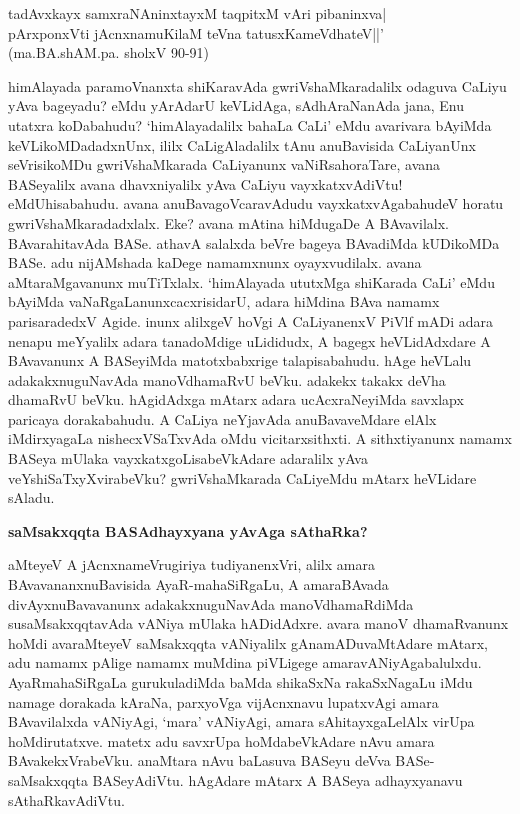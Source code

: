 \begin{shloka}
tadAvxkayx samxraNAninxtayxM taqpitxM vAri pibaninxva|\\
pArxponxVti jAcnxnamuKilaM teVna tatusxKameVdhateV||'\\
\hfill(ma.BA.shAM.pa. sholxV 90-91)
\end{shloka}

himAlayada paramoVnanxta shiKaravAda gwriVshaMkaradalilx odaguva CaLiyu yAva bageyadu? eMdu yArAdarU keVLidAga, sAdhAraNanAda jana, Enu utatxra koDabahudu?  `himAlayadalilx bahaLa CaLi' eMdu avarivara bAyiMda keVLikoMDadadxnUnx, ililx CaLigAladalilx tAnu anuBavisida CaLiyanUnx seVrisikoMDu gwriVshaMkarada CaLiyanunx vaNiRsahoraTare, avana BASeyalilx avana dhavxniyalilx yAva CaLiyu vayxkatxvAdiVtu! eMdUhisabahudu. avana anuBavagoVcaravAdudu vayxkatxvAgabahudeV horatu gwriVshaMkaradadxlalx. Eke? avana mAtina hiMdugaDe A BAvavilalx. BAvarahitavAda BASe. athavA salalxda beVre bageya BAvadiMda kUDikoMDa BASe. adu nijAMshada kaDege namamxnunx oyayxvudilalx. avana aMtaraMgavanunx muTiTxlalx. `himAlayada ututxMga shiKarada CaLi' eMdu bAyiMda vaNaRgaLanunxcacxrisidarU, adara hiMdina BAva namamx parisaradedxV Agide. inunx alilxgeV hoVgi A CaLiyanenxV PiVlf mADi adara nenapu meYyalilx adara tanadoMdige uLididudx, A bagegx heVLidAdxdare A BAvavanunx A BASeyiMda matotxbabxrige talapisabahudu. hAge heVLalu adakakxnuguNavAda manoVdhamaRvU beVku. adakekx takakx deVha dhamaRvU beVku. hAgidAdxga mAtarx adara ucAcxraNeyiMda savxlapx paricaya dorakabahudu. A CaLiya neYjavAda anuBavaveMdare elAlx iMdirxyagaLa nishecxVSaTxvAda oMdu vicitarxsithxti. A sithxtiyanunx namamx BASeya mUlaka vayxkatxgoLisabeVkAdare adaralilx yAva veYshiSaTxyXvirabeVku? gwriVshaMkarada CaLiyeMdu mAtarx heVLidare sAladu.

\textbf{saMsakxqqta BASAdhayxyana yAvAga sAthaRka?}

aMteyeV A jAcnxnameVrugiriya tudiyanenxVri, alilx amara BAvavananxnuBavisida AyaR-mahaSiRgaLu, A amaraBAvada divAyxnuBavavanunx adakakxnuguNavAda manoVdhamaRdiMda susaMsakxqqtavAda vANiya mUlaka hADidAdxre. avara manoV dhamaRvanunx hoMdi avaraMteyeV saMsakxqqta vANiyalilx gAnamADuvaMtAdare mAtarx, adu namamx pAlige namamx muMdina piVLigege amaravANiyAgabalulxdu. AyaRmahaSiRgaLa gurukuladiMda baMda shikaSxNa rakaSxNagaLu iMdu namage dorakada kAraNa, parxyoVga
vijAcnxnavu lupatxvAgi amara BAvavilalxda vANiyAgi, `mara' vANiyAgi, amara sAhitayxgaLelAlx virUpa hoMdirutatxve. matetx adu savxrUpa hoMdabeVkAdare nAvu amara BAvakekxVrabeVku. anaMtara nAvu baLasuva BASeyu deVva BASe-saMsakxqqta BASeyAdiVtu. hAgAdare mAtarx A BASeya adhayxyanavu sAthaRkavAdiVtu.

